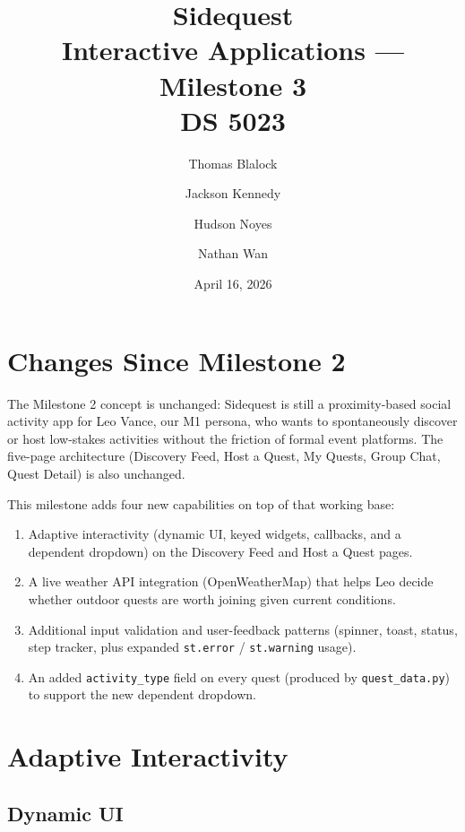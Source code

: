 \documentclass[11pt]{article}
\title{\textbf{Sidequest} \\ \large Interactive Applications --- Milestone 3 \\ \normalsize DS 5023}
\author{Thomas Blalock \and Jackson Kennedy \and Hudson Noyes \and Nathan Wan}
\date{April 16, 2026}
\begin{document}
\maketitle

\tableofcontents
\newpage

\section{Changes Since Milestone 2}

The Milestone 2 concept is unchanged: Sidequest is still a proximity-based social activity app for Leo Vance, our M1 persona, who wants to spontaneously discover or host low-stakes activities without the friction of formal event platforms. The five-page architecture (Discovery Feed, Host a Quest, My Quests, Group Chat, Quest Detail) is also unchanged.

This milestone adds four new capabilities on top of that working base:

\begin{enumerate}[nosep]
    \item Adaptive interactivity (dynamic UI, keyed widgets, callbacks, and a dependent dropdown) on the Discovery Feed and Host a Quest pages.
    \item A live weather API integration (OpenWeatherMap) that helps Leo decide whether outdoor quests are worth joining given current conditions.
    \item Additional input validation and user-feedback patterns (spinner, toast, status, step tracker, plus expanded \texttt{st.error} / \texttt{st.warning} usage).
    \item An added \texttt{activity\_type} field on every quest (produced by \texttt{quest\_data.py}) to support the new dependent dropdown.
\end{enumerate}

\section{Adaptive Interactivity}

\subsection{Dynamic UI}
\end{document}
